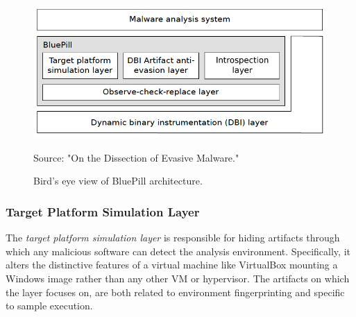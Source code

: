 \documentclass[LaM,binding=0.6cm]{sapthesis}
\newcommand{\source}[1]{\caption*{Source: {#1}} }
\begin{document}
\begin{figure}[h!]
\centering
\includegraphics[scale=.6]{images/techn8}
\caption{Bird's eye view of BluePill architecture.}
\source{"On the Dissection of Evasive Malware."}
\end{figure}

\subsubsection{Target Platform Simulation Layer}
\label{subsec:targetplatformsimulation}
The \textit{target platform simulation layer} is responsible for hiding artifacts through which any malicious software can detect the analysis environment. Specifically, it alters the distinctive features of a virtual machine like VirtualBox mounting a Windows image rather than any other VM or hypervisor. The artifacts on which the layer focuses on, are both related to environment fingerprinting and specific to sample execution.
\end{document}

